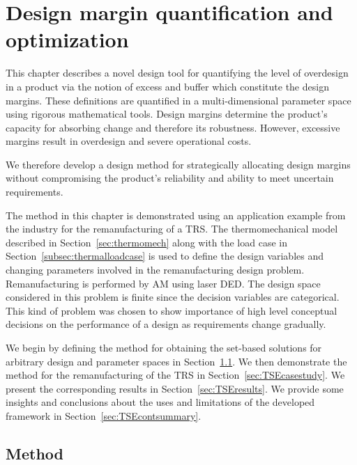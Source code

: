 \chapter{Design margin quantification and optimization}
\label{ch:TSEcont}

This chapter describes a novel design tool for quantifying the level of overdesign in a product via the notion of excess and buffer which constitute the design margins. These definitions are quantified in a multi-dimensional parameter space using rigorous mathematical tools. Design margins determine the product's capacity for absorbing change and therefore its robustness. However, excessive margins result in overdesign and severe operational costs.

We therefore develop a design method for strategically allocating design margins without compromising the product's reliability and ability to meet uncertain requirements.

The method in this chapter is demonstrated using an application example from the industry for the remanufacturing of a \ac{TRS}. The thermomechanical model described in Section~\ref{sec:thermomech} along with the load case in Section~\ref{subsec:thermalloadcase} is used to define the design variables and changing parameters involved in the remanufacturing design problem. Remanufacturing is performed by \ac{AM} using laser \ac{DED}. The design space considered in this problem is finite since the decision variables are categorical. This kind of problem was chosen to show importance of high level conceptual decisions on the performance of a design as requirements change gradually.

We begin by defining the method for obtaining the set-based solutions for arbitrary design and parameter spaces in Section~\ref{sec:TSEmethods}. We then demonstrate the method for the remanufacturing of the \ac{TRS} in Section~\ref{sec:TSEcasestudy}. We present the corresponding results in Section~\ref{sec:TSEresults}. We provide some insights and conclusions about the uses and limitations of the developed framework in Section~\ref{sec:TSEcontsummary}.

\section{Method} \label{sec:TSEmethods}

